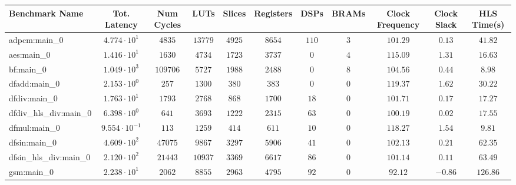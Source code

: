 \begin{tabular}{|l|c|c|c|c|c|c|c|c|c|c|}
\hline
Benchmark Name          & Tot. Latency            & Num Cycles & LUTs      & Slices    & Registers & DSPs    & BRAMs  & Clock Frequency & Clock Slack & HLS Time(s) \\
\hline
adpcm:main\_0           & $ 4.774 \cdot 10^{1}  $ & $ 4835   $ & $ 13779 $ & $ 4925  $ & $ 8654  $ & $ 110 $ & $ 3  $ & $ 101.29      $ & $ 0.13    $ & $ 41.82   $ \\
aes:main\_0             & $ 1.416 \cdot 10^{1}  $ & $ 1630   $ & $ 4734  $ & $ 1723  $ & $ 3737  $ & $ 0   $ & $ 4  $ & $ 115.09      $ & $ 1.31    $ & $ 16.63   $ \\
bf:main\_0              & $ 1.049 \cdot 10^{3}  $ & $ 109706 $ & $ 5727  $ & $ 1988  $ & $ 2488  $ & $ 0   $ & $ 8  $ & $ 104.56      $ & $ 0.44    $ & $ 8.98    $ \\
dfadd:main\_0           & $ 2.153 \cdot 10^{0}  $ & $ 257    $ & $ 1300  $ & $ 380   $ & $ 383   $ & $ 0   $ & $ 0  $ & $ 119.37      $ & $ 1.62    $ & $ 30.22   $ \\
dfdiv:main\_0           & $ 1.763 \cdot 10^{1}  $ & $ 1793   $ & $ 2768  $ & $ 868   $ & $ 1700  $ & $ 18  $ & $ 0  $ & $ 101.71      $ & $ 0.17    $ & $ 17.27   $ \\
dfdiv\_hls\_div:main\_0 & $ 6.398 \cdot 10^{0}  $ & $ 641    $ & $ 3693  $ & $ 1222  $ & $ 2315  $ & $ 63  $ & $ 0  $ & $ 100.19      $ & $ 0.02    $ & $ 17.55   $ \\
dfmul:main\_0           & $ 9.554 \cdot 10^{-1} $ & $ 113    $ & $ 1259  $ & $ 414   $ & $ 611   $ & $ 10  $ & $ 0  $ & $ 118.27      $ & $ 1.54    $ & $ 9.81    $ \\
dfsin:main\_0           & $ 4.609 \cdot 10^{2}  $ & $ 47075  $ & $ 9867  $ & $ 3297  $ & $ 5906  $ & $ 41  $ & $ 0  $ & $ 102.13      $ & $ 0.21    $ & $ 62.35   $ \\
dfsin\_hls\_div:main\_0 & $ 2.120 \cdot 10^{2}  $ & $ 21443  $ & $ 10937 $ & $ 3369  $ & $ 6617  $ & $ 86  $ & $ 0  $ & $ 101.14      $ & $ 0.11    $ & $ 63.49   $ \\
gsm:main\_0             & $ 2.238 \cdot 10^{1}  $ & $ 2062   $ & $ 8855  $ & $ 2963  $ & $ 4795  $ & $ 92  $ & $ 0  $ & $ 92.12       $ & $ -0.86   $ & $ 126.86  $ \\

\end{tabular}
